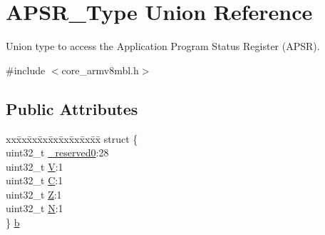 \hypertarget{union_a_p_s_r___type}{}\section{A\+P\+S\+R\+\_\+\+Type Union Reference}
\label{union_a_p_s_r___type}


Union type to access the Application Program Status Register (A\+P\+SR).  




{\ttfamily \#include $<$core\+\_\+armv8mbl.\+h$>$}

\subsection*{Public Attributes}
\begin{DoxyCompactItemize}
\item 
\begin{tabbing}
xx\=xx\=xx\=xx\=xx\=xx\=xx\=xx\=xx\=\kill
struct \{\\
\>uint32\_t \mbox{\hyperlink{union_a_p_s_r___type_afbce95646fd514c10aa85ec0a33db728}{\_reserved0}}:28\\
\>uint32\_t \mbox{\hyperlink{union_a_p_s_r___type_a8004d224aacb78ca37774c35f9156e7e}{V}}:1\\
\>uint32\_t \mbox{\hyperlink{union_a_p_s_r___type_a86e2c5b891ecef1ab55b1edac0da79a6}{C}}:1\\
\>uint32\_t \mbox{\hyperlink{union_a_p_s_r___type_a3b04d58738b66a28ff13f23d8b0ba7e5}{Z}}:1\\
\>uint32\_t \mbox{\hyperlink{union_a_p_s_r___type_a7e7bbba9b00b0bb3283dc07f1abe37e0}{N}}:1\\
\} \mbox{\hyperlink{union_a_p_s_r___type_a7dbc79a057ded4b11ca5323fc2d5ab14}{b}}\\


\end{tabbing}
\end{DoxyCompactItemize}
